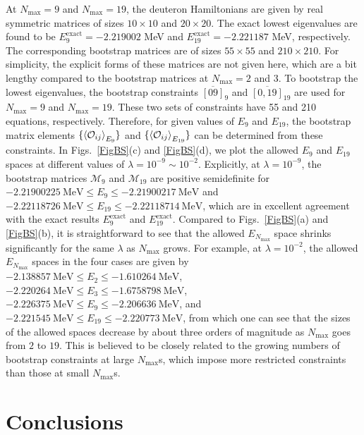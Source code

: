 \documentclass[aps,prc,reprint,superscriptaddress,nofootinbib]{revtex4-2}
\begin{document}
At $N_\text{max}=9$ and $N_\text{max}=19$, the deuteron Hamiltonians are given by real symmetric matrices of sizes $10\times10$ and $20\times20$.
The exact lowest eigenvalues are found to be $E^\text{exact}_9=-2.219002$ MeV and $E^\text{exact}_{19}=-2.221187$ MeV, respectively.
The corresponding bootstrap matrices are of sizes $55\times55$ and $210\times210$.
For simplicity, the explicit forms of these matrices are not given here, which are a bit lengthy compared to the bootstrap matrices at $N_\text{max}=2$ and 3.
To bootstrap the lowest eigenvalues, the bootstrap constraints $\overline{[09]}_9$ and $\overline{[0,19]}_{19}$
are used for $N_\text{max}=9$ and $N_\text{max}=19$.
These two sets of constraints have 55 and 210 equations, respectively.
Therefore, for given values of $E_9$ and $E_{19}$,
the bootstrap matrix elements $\{\braket{\mathcal{O}_{ij}}_{E_9}\}$ and $\{\braket{\mathcal{O}_{ij}}_{E_{19}}\}$
can be determined from these constraints.
In Figs.~\ref{FigBS}(c) and \ref{FigBS}(d), 
we plot the allowed $E_9$ and $E_{19}$ spaces at different values of $\lambda=10^{-9}\sim10^{-2}$.
Explicitly,
at $\lambda=10^{-9}$, 
the bootstrap matrices $\bm{\mathcal{M}}_9$ and $\bm{\mathcal{M}}_{19}$ are positive semidefinite for
$-2.21900225\ \text{MeV}\leq E_9\leq-2.21900217\ \text{MeV}$
and $-2.22118726\ \text{MeV}\leq E_{19}\leq -2.22118714\ \text{MeV}$,
which are in excellent agreement with the exact results $E_9^\text{exact}$ and $E_{19}^\text{exact}$.
Compared to Figs.~\ref{FigBS}(a) and \ref{FigBS}(b),
it is straightforward to see that 
the allowed $E_{N_\text{max}}$ space shrinks significantly for the same $\lambda$ as $N_\text{max}$ grows.
For example, at $\lambda=10^{-2}$, the allowed $E_{N_\text{max}}$ spaces in the four cases are given by 
$-2.138857\ \text{MeV}\leq E_2\leq-1.610264\ \text{MeV}$,
$-2.220264\ \text{MeV}\leq E_3\leq-1.6758798\ \text{MeV}$,
$-2.226375\ \text{MeV}\leq E_9\leq-2.206636\ \text{MeV}$,
and
$-2.221545\ \text{MeV}\leq E_{19}\leq-2.220773\ \text{MeV}$,
from which one can see that
the sizes of the allowed spaces decrease by about three orders of magnitude as $N_\text{max}$ goes from $2$ to $19$.
This is believed to be closely related to the growing numbers of bootstrap constraints at large $N_\text{max}$s,
which impose more restricted constraints than those at small $N_\text{max}$s. 


\section{Conclusions}
\label{Concl}
\end{document}
